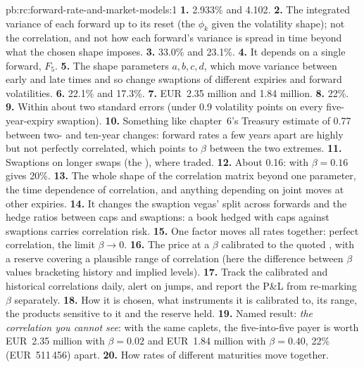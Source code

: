 \begin{solution}{pb:rc:forward-rate-and-market-models:1}
\textbf{1.} 2.933\% and 4.102.
\textbf{2.} The integrated variance of each forward up to its reset (the $\phi_k$
given the volatility shape); not the correlation, and not how each forward's
variance is spread in time beyond what the chosen shape imposes.
\textbf{3.} 33.0\% and 23.1\%.
\textbf{4.} It depends on a single forward, $F_5$.
\textbf{5.} The shape parameters $a,b,c,d$, which move variance between early and late
times and so change swaptions of different expiries and forward volatilities.
\textbf{6.} 22.1\% and 17.3\%.
\textbf{7.} EUR~2.35 million and 1.84 million.
\textbf{8.} 22\%.
\textbf{9.} Within about two standard errors (under 0.9 volatility points on every
five-year-expiry swaption).
\textbf{10.} Something like chapter~6's Treasury estimate of 0.77 between two- and
ten-year changes: forward rates a few years apart are highly but not perfectly
correlated, which points to $\beta$ between the two extremes.
\textbf{11.} Swaptions on longer swaps (the ), 
where traded.
\textbf{12.} About 0.16: with $\beta=0.16$  gives 20\%.
\textbf{13.} The whole shape of the correlation matrix beyond one parameter, the
time dependence of correlation, and anything depending on joint moves at other
expiries.
\textbf{14.} It changes the swaption vegas' split across forwards and the hedge
ratios between caps and swaptions: a book hedged with caps against swaptions
carries correlation risk.
\textbf{15.} One factor moves all rates together: perfect correlation, the limit
$\beta\to0$.
\textbf{16.} The price at a $\beta$ calibrated to the quoted , with a
reserve covering a plausible range of correlation (here the difference between
$\beta$ values bracketing history and implied levels).
\textbf{17.} Track the calibrated and historical correlations daily, alert on jumps,
and report the P\&L from re-marking $\beta$ separately.
\textbf{18.} How it is chosen, what instruments it is calibrated to, its range, the
products sensitive to it and the reserve held.
\textbf{19.} Named result: \emph{the correlation you cannot see}: with the same caplets,
the five-into-five payer is worth EUR~2.35 million with $\beta=0.02$ and EUR~1.84
million with $\beta=0.40$, 22\% (EUR~511\,456) apart.
\textbf{20.} How rates of different maturities move together.
\end{solution}

